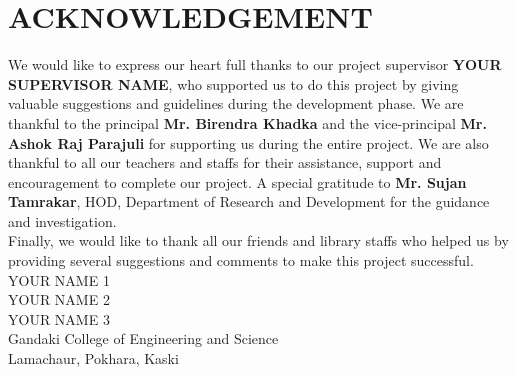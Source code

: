 
\section*{\center ACKNOWLEDGEMENT}
	
We would like to express our heart full thanks to our project supervisor \textbf{YOUR SUPERVISOR NAME}, who supported us to do this project by giving valuable suggestions and guidelines during the development phase. We are thankful to the principal \textbf{Mr. Birendra Khadka} and the vice-principal \textbf{Mr. Ashok Raj Parajuli} for supporting us during the entire project. We are also thankful to all our teachers and staffs for their assistance, support and encouragement to complete our project. A special gratitude to \textbf{Mr. Sujan Tamrakar}, HOD, Department of Research and Development for the guidance and investigation.\\
\linebreak
Finally, we would like to thank all our friends and library staffs who helped us by providing several suggestions and comments to make this project successful.\\
\linebreak
YOUR NAME 1\\
YOUR NAME 2\\
YOUR NAME 3\\
\linebreak
Gandaki College of Engineering and Science\\
Lamachaur, Pokhara, Kaski